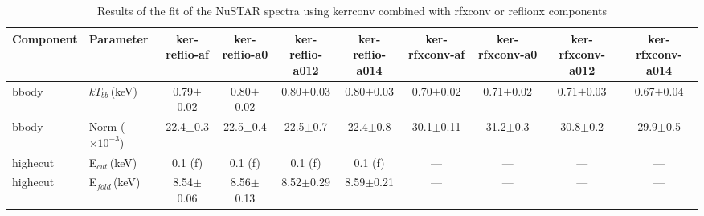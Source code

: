 \documentclass{aa}
\begin{document}
\begin{appendix}



\begin{sidewaystable*}



\caption{Results of the fit of the NuSTAR spectra using kerrconv combined with 
rfxconv or reflionx components \label{tab:fit_3}}             
  
 
  
    
\centering  
        
\scriptsize




\begin{tabular}{llcccccccc}     %
\hline\hline       

Component &
Parameter &




ker-reflio-af &
ker-reflio-a0 &
ker-reflio-a012 &
ker-reflio-a014 &
ker-rfxconv-af &
ker-rfxconv-a0 &
ker-rfxconv-a012 &
ker-rfxconv-a014 \\






\hline




bbody & 
$kT_{bb}\,$(keV) & 
0.79$\pm$0.02 &
0.80$\pm$0.02 &
0.80$\pm$0.03 &
0.80$\pm$0.03 &
0.70$\pm$0.02 &
0.71$\pm$0.02 &
0.71$\pm$0.03 &
0.67$\pm$0.04 \\

bbody & 
Norm ($\times10^{-3}$) &  
22.4$\pm$0.3 &
22.5$\pm$0.4 &
22.5$\pm$0.7 &
22.4$\pm$0.8 &
30.1$\pm$0.11 &
31.2$\pm$0.3 &
30.8$\pm$0.2 &
29.9$\pm$0.5 \\






\hline

highecut &
E$_{cut}\,$(keV)   & 
0.1 (f)&
0.1 (f) &
0.1 (f) &
0.1 (f) &
---&
---&
---&
--- \\



highecut &
E$_{fold}\,$(keV)   & 
8.54$\pm$0.06 &
8.56$\pm$0.13 &
8.52$\pm$0.29 &
8.59$\pm$0.21 &
---&
---&
---&
--- \\







\end{tabular}
\end{sidewaystable*}
\end{appendix}
\end{document}
